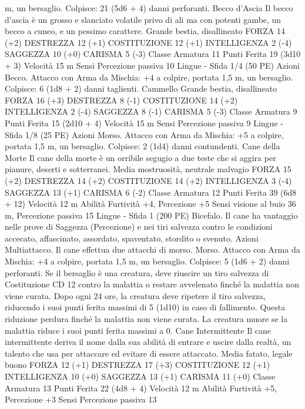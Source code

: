 \begin{multicols}{2}
m, un bersaglio.
Colpisce: 21 (5d6 + 4) danni perforanti.
Becco d’Ascia
Il becco d’ascia è un grosso e slanciato volatile privo di
ali ma con potenti gambe, un becco a cuneo, e un
pessimo carattere.
Grande bestia, disallineato
FORZA 14 (+2)
DESTREZZA 12 (+1)
COSTITUZIONE 12 (+1)
INTELLIGENZA 2 (-4)
SAGGEZZA 10 (+0)
CARISMA 5 (-3)
Classe Armatura 11
Punti Ferita 19 (3d10 + 3)
Velocità 15 m
Sensi Percezione passiva 10
Lingue -
Sfida 1/4 (50 PE)
Azioni
Becco. Attacco con Arma da Mischia: +4 a colpire, portata 1,5
m, un bersaglio.
Colpisce: 6 (1d8 + 2) danni taglienti.
Cammello
Grande bestia, disallineato
FORZA 16 (+3)
DESTREZZA 8 (-1)
COSTITUZIONE 14 (+2)
INTELLIGENZA 2 (-4)
SAGGEZZA 8 (-1)
CARISMA 5 (-3)
Classe Armatura 9
Punti Ferita 15 (2d10 + 4)
Velocità 15 m
Sensi Percezione passiva 9
Lingue -
Sfida 1/8 (25 PE)
Azioni
Morso. Attacco con Arma da Mischia: +5 a colpire, portata 1,5
m, un bersaglio.
Colpisce: 2 (1d4) danni contundenti.
Cane della Morte
Il cane della morte è un orribile segugio a due teste che
si aggira per pianure, deserti e sotterranei.
Media mostruosità, neutrale malvagio
FORZA 15 (+2)
DESTREZZA 14 (+2)
COSTITUZIONE 14 (+2)
INTELLIGENZA 3 (-4)
SAGGEZZA 13 (+1)
CARISMA 6 (-2)
Classe Armatura 12
Punti Ferita 39 (6d8 + 12)
Velocità 12 m
Abilità Furtività +4, Percezione +5
Sensi visione al buio 36 m, Percezione passiva 15
Lingue -
Sfida 1 (200 PE)
Bicefalo. Il cane ha vantaggio nelle prove di Saggezza
(Percezione) e nei tiri salvezza contro le condizioni accecato,
affascinato, assordato, spaventato, stordito o svenuto.
Azioni
Multiattacco. Il cane effettua due attacchi di morso.
Morso. Attacco con Arma da Mischia: +4 a colpire, portata 1,5
m, un bersaglio.
Colpisce: 5 (1d6 + 2) danni perforanti. Se il bersaglio è una
creatura, deve riuscire un tiro salvezza di Costituzione CD 12
contro la malattia o restare avvelenato finché la malattia non
viene curata. Dopo ogni 24 ore, la creatura deve ripetere il tiro
salvezza, riducendo i suoi punti ferita massimi di 5 (1d10) in
caso di fallimento. Questa riduzione perdura finché la malattia
non viene curata. La creatura muore se la malattia riduce i suoi
punti ferita massimi a 0.
Cane Intermittente
Il cane intermittente deriva il nome dalla sua abilità di
entrare e uscire dalla realtà, un talento che usa per
attaccare ed evitare di essere attaccato.
Media fatato, legale buono
FORZA 12 (+1)
DESTREZZA 17 (+3)
COSTITUZIONE 12 (+1)
INTELLIGENZA 10 (+0)
SAGGEZZA 13 (+1)
CARISMA 11 (+0)
Classe Armatura 13
Punti Ferita 22 (4d8 + 4)
Velocità 12 m
Abilità Furtività +5, Percezione +3
Sensi Percezione passiva 13

\end{multicols}
